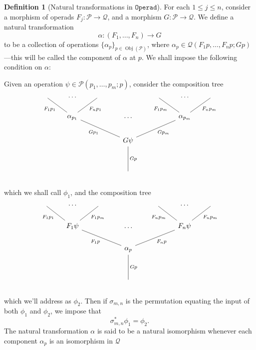 \documentclass[11pt, reqno]{amsart}
\theoremstyle{definition}
\newtheorem{definition}[theorem]{Definition}
\renewcommand{\leq}{\leqslant}
\newcommand{\catfont}{\texttt}
\DeclareMathOperator{\Obj}{Obj}   %
\newcommand{\operad}{\mathcal}
\newcommand{\Operad}{{\catfont{Operad}}}
\begin{document}
\begin{definition}[Natural transformations in \(\Operad\)]
\label{def:nat-transf-in-operad}
For each \(1 \leq j \leq n\), consider a morphism of operads \(F_j: \operad P \to \operad Q\), and a morphism \(G: \operad P \to \operad Q\). We define a natural transformation
\[
    \alpha: (F_1, \dots, F_n) \longrightarrow G
\]
to be a collection of operations \(\{\alpha_p\}_{p \in \Obj(\operad P)}\),
where \(\alpha_p \in \operad Q(F_1 p, \dots, F_n p; G p)\)---this will be
called the component of \(\alpha\) at \(p\). We shall impose the following
condition on \(\alpha\):

Given an operation \(\psi \in \operad P(p_1, \dots, p_m; p)\), consider the
composition tree
\[
    \begin{tikzcd}
         \ar[rd, no head, "F_1 p_1"'] &\dots &\ar[dl, no head, "F_n p_1"]
        &
        &\ar[rd, no head, "F_1 p_m"'] &\dots &\ar[dl, no head, "F_n p_m"]
        \\
            &\alpha_{p_1} \ar[rrd, no head, "G p_1"'] &
        &\dots
        & &\alpha_{p_m} \ar[lld, no head, "G p_m"] &
        \\
          & &
        &G \psi \ar[dd, "G p", no head]
        & & &
        \\
          & &
        &
        &  & &
        \\
          & &
        &\phantom{f}
        & & &
    \end{tikzcd}
\]
which we shall call \(\phi_1\), and the composition tree
\[
    \begin{tikzcd}
         \ar[rd, no head, "F_1 p_1"'] &\dots &\ar[dl, no head, "F_1 p_m"]
        &
        &\ar[rd, no head, "F_n p_m"'] &\dots &\ar[dl, no head, "F_n p_m"]
        \\
            &F_1 \psi \ar[rrd, no head, "F_1 p"'] &
        &\dots
        & &F_n \psi \ar[lld, no head, "F_n p"] &
        \\
          & &
        &\alpha_p \ar[dd, "G p", no head]
        & & &
        \\
          & &
        &
        &  & &
        \\
          & &
        &\phantom{f}
        & & &
    \end{tikzcd}
\]
which we'll address as \(\phi_2\). Then if \(\sigma_{m, n}\) is the permutation
equating the input of both \(\phi_1\) and \(\phi_2\), we impose that
\[
    \sigma_{m, n}^* \phi_1 = \phi_2.
\]
The natural transformation \(\alpha\) is said to be a natural isomorphism
whenever each component \(\alpha_p\) is an isomorphism in \(\operad Q\)
\end{definition}
\end{document}
